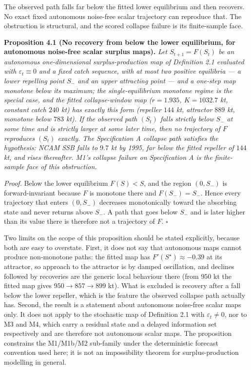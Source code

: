 \documentclass[11pt]{article}
\begin{document}
The observed path falls far below the fitted lower equilibrium and then
recovers. No exact fixed autonomous noise-free scalar trajectory can
reproduce that. The obstruction is structural, and the scored collapse
failure is its finite-sample face.

\textbf{Proposition 4.1 (No recovery from below the lower equilibrium,
for autonomous noise-free scalar surplus maps).} \emph{Let
\(S_{t+1}=F(S_t)\) be an autonomous one-dimensional surplus-production
map of Definition 2.1 evaluated with \(\varepsilon_t \equiv 0\) and a
fixed catch sequence, with at most two positive equilibria --- a lower
repelling point \(S_-\) and an upper attracting point --- and a one-step
map monotone below its maximum; the single-equilibrium monotone regime
is the special case, and the fitted collapse-window map (\(r = 1.935\),
\(K = 1032.7\) kt, constant catch \(240\) kt) has exactly this form
(repeller \(144\) kt, attractor \(889\) kt, monotone below \(783\) kt).
If the observed path \((S_t)\) falls strictly below \(S_-\) at some
time and is strictly larger at some later time, then no trajectory of
\(F\) reproduces \((S_t)\) exactly. The Specification A collapse path
satisfies the hypothesis: NCAM SSB falls to \(9.7\) kt by 1995, far
below the fitted repeller of \(144\) kt, and rises thereafter. M1's
collapse failure on Specification A is the finite-sample face of this
obstruction.}

\emph{Proof.} Below the lower equilibrium \(F(S) < S\), and the region
\((0, S_-)\) is forward-invariant because \(F\) is monotone there and
\(F(S_-) = S_-\). Hence every trajectory that enters \((0, S_-)\)
decreases monotonically toward the absorbing state and never returns
above \(S_-\). A path that goes below \(S_-\) and is later higher than
its value there is therefore not a trajectory of \(F\).
\ensuremath{\square}

Two limits on the scope of this proposition should be stated
explicitly, because both are easy to overstate. First, it does not say
that autonomous maps cannot produce non-monotone paths: the fitted map
has \(F'(S^\star) \approx -0.39\) at its attractor, so approach to the
attractor is by damped oscillation, and declines followed by recoveries
are the generic local behaviour there (from \(950\) kt the fitted map
gives \(950 \to 857 \to 899\) kt). What is excluded is recovery after a
fall below the lower repeller, which is the feature the observed
collapse path actually has. Second, the result is a statement about
autonomous noise-free scalar maps only. It does not apply to the
stochastic map of Definition 2.1 with \(\varepsilon_t \neq 0\), nor to
M3 and M4, which carry a residual state and a delayed information set
respectively and are therefore not autonomous scalar maps. The
proposition constrains the M1/M1b/M2 sub-family under the deterministic
forecast convention used here; it is not an impossibility theorem for
surplus-production modelling in general.
\end{document}
